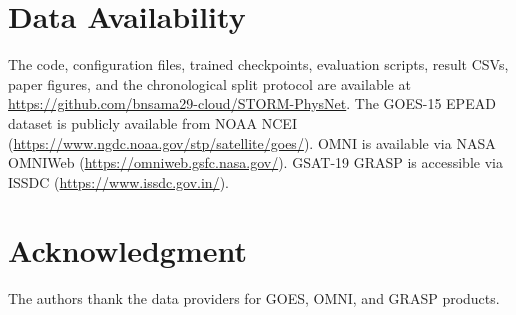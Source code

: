 ﻿\documentclass{ieeeaccess}
\begin{document}
\section*{Data Availability}
The code, configuration files, trained checkpoints, evaluation scripts,
result CSVs, paper figures, and the chronological split protocol are
available at
\url{https://github.com/bnsama29-cloud/STORM-PhysNet}.
The GOES-15 EPEAD dataset is publicly available from NOAA NCEI
(\url{https://www.ngdc.noaa.gov/stp/satellite/goes/}).
OMNI is available via NASA OMNIWeb
(\url{https://omniweb.gsfc.nasa.gov/}).
GSAT-19 GRASP is accessible via ISSDC
(\url{https://www.issdc.gov.in/}).
\section*{Acknowledgment}
The authors thank the data providers for GOES, OMNI, and GRASP products.
\end{document}
